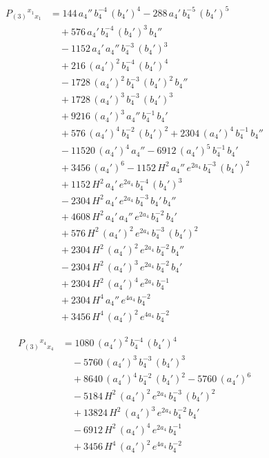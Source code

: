 \documentclass[11pt]{article}
\begin{document}
\[
\begin{aligned}
P_{(3)}{}^{x_1}{}_{x_1} &= 144\,a_4''\,b_4^{-4}\,(b_4')^{4} - 288\,a_4'\,b_4^{-5}\,(b_4')^{5} \\
&\quad + 576\,a_4'\,b_4^{-4}\,(b_4')^{3}\,b_4'' \\
&\quad - 1152\,a_4'\,a_4''\,b_4^{-3}\,(b_4')^{3} \\
&\quad + 216\,(a_4')^{2}\,b_4^{-4}\,(b_4')^{4} \\
&\quad - 1728\,(a_4')^{2}\,b_4^{-3}\,(b_4')^{2}\,b_4'' \\
&\quad + 1728\,(a_4')^{3}\,b_4^{-3}\,(b_4')^{3} \\
&\quad + 9216\,(a_4')^{3}\,a_4''\,b_4^{-1}\,b_4' \\
&\quad + 576\,(a_4')^{4}\,b_4^{-2}\,(b_4')^{2} + 2304\,(a_4')^{4}\,b_4^{-1}\,b_4'' \\
&\quad - 11520\,(a_4')^{4}\,a_4'' - 6912\,(a_4')^{5}\,b_4^{-1}\,b_4' \\
&\quad + 3456\,(a_4')^{6} - 1152\,H^{2}\,a_4''\,e^{2 a_4}\,b_4^{-3}\,(b_4')^{2} \\
&\quad + 1152\,H^{2}\,a_4'\,e^{2 a_4}\,b_4^{-4}\,(b_4')^{3} \\
&\quad - 2304\,H^{2}\,a_4'\,e^{2 a_4}\,b_4^{-3}\,b_4'\,b_4'' \\
&\quad + 4608\,H^{2}\,a_4'\,a_4''\,e^{2 a_4}\,b_4^{-2}\,b_4' \\
&\quad + 576\,H^{2}\,(a_4')^{2}\,e^{2 a_4}\,b_4^{-3}\,(b_4')^{2} \\
&\quad + 2304\,H^{2}\,(a_4')^{2}\,e^{2 a_4}\,b_4^{-2}\,b_4'' \\
&\quad - 2304\,H^{2}\,(a_4')^{3}\,e^{2 a_4}\,b_4^{-2}\,b_4' \\
&\quad + 2304\,H^{2}\,(a_4')^{4}\,e^{2 a_4}\,b_4^{-1} \\
&\quad + 2304\,H^{4}\,a_4''\,e^{4 a_4}\,b_4^{-2} \\
&\quad + 3456\,H^{4}\,(a_4')^{2}\,e^{4 a_4}\,b_4^{-2}
\end{aligned}
\]

\[
\begin{aligned}
P_{(3)}{}^{x_4}{}_{x_4} &= 1080\,(a_4')^{2}\,b_4^{-4}\,(b_4')^{4} \\
&\quad - 5760\,(a_4')^{3}\,b_4^{-3}\,(b_4')^{3} \\
&\quad + 8640\,(a_4')^{4}\,b_4^{-2}\,(b_4')^{2} - 5760\,(a_4')^{6} \\
&\quad - 5184\,H^{2}\,(a_4')^{2}\,e^{2 a_4}\,b_4^{-3}\,(b_4')^{2} \\
&\quad + 13824\,H^{2}\,(a_4')^{3}\,e^{2 a_4}\,b_4^{-2}\,b_4' \\
&\quad - 6912\,H^{2}\,(a_4')^{4}\,e^{2 a_4}\,b_4^{-1} \\
&\quad + 3456\,H^{4}\,(a_4')^{2}\,e^{4 a_4}\,b_4^{-2}
\end{aligned}
\]
\end{document}

